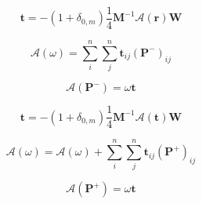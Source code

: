 \begin{equation}
\mathbf{t} = -(1 + \delta_{0,m}) \frac{1}{4}\mathbf{M}^{-1}\mathcal{A}(\mathbf{r})\mathbf{W}
\label{eq:local_r_and_t-adjoint_of_tangent_linear-t}
\end{equation}

\begin{equation}
\mathcal{A}(\omega) = \sum^{n}_{i} \sum^{n}_{j} \mathbf{t}_{ij} (\mathbf{P}^{-})_{ij}
\label{eq:local_r_and_t-adjoint_of_tangent_linear-omega_a}
\end{equation}

\begin{equation}
\mathcal{A}(\mathbf{P}^{-}) = \omega \mathbf{t}
\label{eq:local_r_and_t-adjoint_of_tangent_linear-p_m_a}
\end{equation}

\begin{equation}
\mathbf{t} = -(1 + \delta_{0,m}) \frac{1}{4}\mathbf{M}^{-1}\mathcal{A}(\mathbf{t})\mathbf{W}
\label{eq:local_r_and_t-adjoint_of_tangent_linear-t}
\end{equation}

\begin{equation}
\mathcal{A}(\omega) = \mathcal{A}(\omega) + \sum^{n}_{i} \sum^{n}_{j} \mathbf{t}_{ij} (\mathbf{P}^{+})_{ij}
\label{eq:local_r_and_t-adjoint_of_tangent_linear-omega_a2}
\end{equation}

\begin{equation}
\mathcal{A}(\mathbf{P}^{+}) = \omega \mathbf{t}
\label{eq:local_r_and_t-adjoint_of_tangent_linear-p_p_a}
\end{equation}
